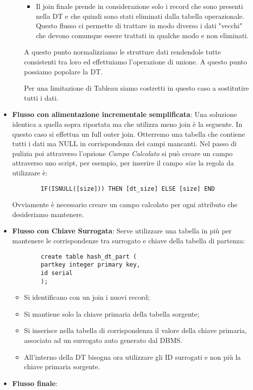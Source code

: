 \begin{itemize}
\begin{itemize}
\begin{itemize}
			\item Il join finale prende in considerazione solo i record che sono presenti nella DT e che quindi sono stati eliminati dalla tabella operazionale. Questo flusso ci permette di trattare in modo diverso i dati "vecchi" che devono comunque essere trattati in qualche modo e non eliminati.
		\end{itemize}
		A questo punto normalizziamo le strutture dati rendendole tutte consistenti tra loro ed effettuiamo l'operazione di unione. A questo punto possiamo popolare la DT.
		\begin{warn}
			Per una limitazione di Tableau siamo costretti in questo caso a sostitutire tutti i dati.
		\end{warn}
	\end{itemize}
	\item \textbf{Flusso con alimentazione incrementale semplificata}:
	Una soluzione identica a quella sopra riportata ma che utilizza meno join è la seguente.
	In questo caso si effettua un full outer join. Otterremo una tabella che contiene tutti i dati ma NULL in corrispondenza dei campi mancanti. Nel passo di pulizia poi attraverso l'opzione \textit{Campo Calcolato} si può creare un campo attraverso uno script, per esempio, per inserire il campo \textit{size} la regola da utilizzare è: 
	\begin{verbatim}
		IF(ISNULL([size])) THEN [dt_size] ELSE [size] END
	\end{verbatim}
	Ovviamente è necessario creare un campo calcolato per ogni attributo che desideriamo mantenere.
	\item \textbf{Flusso con Chiave Surrogata}:
	Serve utilizzare una tabella in più per mantenere le corrispondenze tra surrogato e chiave della tabella di partenza:
	\begin{verbatim}
		create table hash_dt_part (
		partkey integer primary key,
		id serial
		);
	\end{verbatim}
	\begin{itemize}
		\item Si identificano con un join i nuovi record;
		\item Si mantiene solo la chiave primaria della tabella sorgente;
		\item Si inserisce nella tabella di corrispondenza il valore della chiave primaria, associato ad un surrogato auto generato dal DBMS.
		\item All'interno della DT bisogna ora utilizzare gli ID surrogati e non più la chiave primaria sorgente.
	\end{itemize}
	\item \textbf{Flusso finale}:
\end{itemize}

\newpage